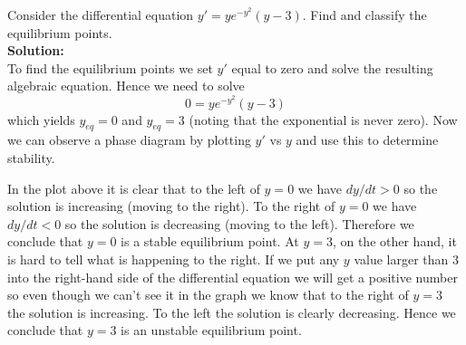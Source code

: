 \begin{example}
    Consider the differential equation $y' = y e^{-y^2}(y-3)$.  Find and classify the
    equilibrium points. \\ {\bf Solution:} \\
    To find the equilibrium points we set $y'$ equal to zero and solve the resulting
    algebraic equation.  Hence we need to solve
    \[ 0 = y e^{-y^2} (y-3) \]
    which yields $y_{eq} = 0$ and $y_{eq} = 3$ (noting that the exponential is never zero).  
    Now we can observe a phase diagram by plotting $y'$ vs $y$ and use this to determine
    stability.
    \begin{center}
    \end{center}
    In the plot above it is clear that to the left of $y=0$ we have $dy/dt > 0$ so the
    solution is increasing (moving to the right).  To the right of $y=0$ we have $dy/dt <
    0$ so the solution is decreasing (moving to the left).  Therefore we conclude that
    $y=0$ is a stable equilibrium point.  At $y=3$, on the other hand, it is hard to tell
    what is happening to the right.  If we put any $y$ value larger than 3 into the
    right-hand side of the differential equation we will get a positive number so even
    though we can't see it in the graph we know that to the right of $y=3$ the solution is
    increasing.  To the left the solution is clearly decreasing.  Hence we conclude that
    $y=3$ is an unstable equilibrium point.
\end{example}


